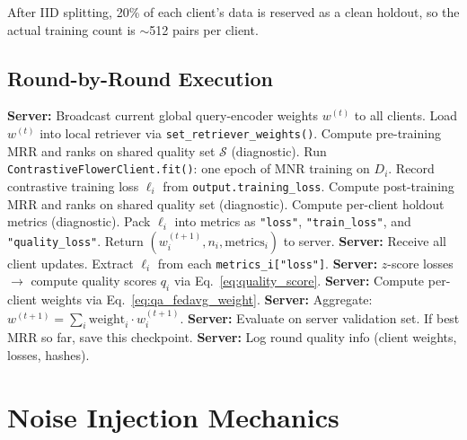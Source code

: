 \documentclass[12pt,a4paper]{article}
\begin{document}
After IID splitting, 20\% of each client's data is reserved as a clean holdout, so the actual training count is $\sim$512 pairs per client.

\subsection{Round-by-Round Execution}

\begin{algorithm}[H]
\caption{Single Federated Round in QA-FedRAG (Current Implementation)}
\begin{algorithmic}[1]
\State \textbf{Server:} Broadcast current global query-encoder weights $w^{(t)}$ to all clients.
  \State Load $w^{(t)}$ into local retriever via \texttt{set\_retriever\_weights()}.
  \State Compute pre-training MRR and ranks on shared quality set $\mathcal{S}$ (diagnostic).
  \State Run \texttt{ContrastiveFlowerClient.fit()}: one epoch of MNR training on $D_i$.
  \State Record contrastive training loss $\ell_i$ from \texttt{output.training\_loss}.
  \State Compute post-training MRR and ranks on shared quality set (diagnostic).
  \State Compute per-client holdout metrics (diagnostic).
  \State Pack $\ell_i$ into metrics as \texttt{"loss"}, \texttt{"train\_loss"}, and \texttt{"quality\_loss"}.
  \State Return $(w_i^{(t+1)}, n_i, \text{metrics}_i)$ to server.
\EndFor
\State \textbf{Server:} Receive all client updates. Extract $\ell_i$ from each \texttt{metrics\_i["loss"]}.
\State \textbf{Server:} $z$-score losses $\rightarrow$ compute quality scores $q_i$ via Eq.~\ref{eq:quality_score}.
\State \textbf{Server:} Compute per-client weights via Eq.~\ref{eq:qa_fedavg_weight}.
\State \textbf{Server:} Aggregate: $w^{(t+1)} = \sum_i \text{weight}_i \cdot w_i^{(t+1)}$.
\State \textbf{Server:} Evaluate on server validation set. If best MRR so far, save this checkpoint.
\State \textbf{Server:} Log round quality info (client weights, losses, hashes).
\end{algorithmic}
\end{algorithm}

\section{Noise Injection Mechanics}
\end{document}
